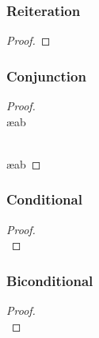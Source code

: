 \begin{multicols}{2}
\subsubsection*{Reiteration}

\begin{proof}
	 
\end{proof}


\subsubsection*{Conjunction}

\begin{proof}
	 

\\	 \ae{ab}

\\	 \ae{ab}
\end{proof}

\subsubsection*{Conditional}

\begin{proof}
	\open
		\ellipsesline
	\close

\\	
	 
\end{proof}

\subsubsection*{Biconditional}

\begin{proof}

\\
\end{proof}


\end{multicols}
